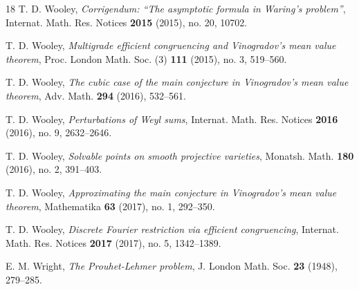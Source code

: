 \documentclass[12pt,reqno]{amsart}
\theoremstyle{definition}
\theoremstyle{remark}
\numberwithin{equation}{section}
\begin{document}
\begin{thebibliography}{18}
T. D. Wooley, \emph{Corrigendum: ``The asymptotic formula in Waring's problem''}, 
Internat. Math. Res. Notices \textbf{2015} (2015), no. 20, 10702.

T. D. Wooley, \emph{Multigrade efficient congruencing and Vinogradov's mean value 
theorem}, Proc. London Math. Soc. (3) \textbf{111} (2015), no. 3, 519--560.

T. D. Wooley, \emph{The cubic case of the main conjecture in Vinogradov's mean value 
theorem}, Adv. Math. \textbf{294} (2016), 532--561.

T. D. Wooley, \emph{Perturbations of Weyl sums}, Internat. Math. Res. Notices 
\textbf{2016} (2016), no. 9, 2632--2646.

T. D. Wooley, \emph{Solvable points on smooth projective varieties}, Monatsh. Math. 
\textbf{180} (2016), no. 2, 391--403.

T. D. Wooley, \emph{Approximating the main conjecture in Vinogradov's mean value 
theorem}, Mathematika \textbf{63} (2017), no. 1, 292--350.

T. D. Wooley, \emph{Discrete Fourier restriction via efficient congruencing}, Internat. Math. 
Res. Notices \textbf{2017} (2017), no. 5, 1342--1389.

E. M. Wright, \emph{The Prouhet-Lehmer problem}, J. London Math. Soc. \textbf{23} 
(1948), 279--285.

\end{thebibliography}
\end{document}
